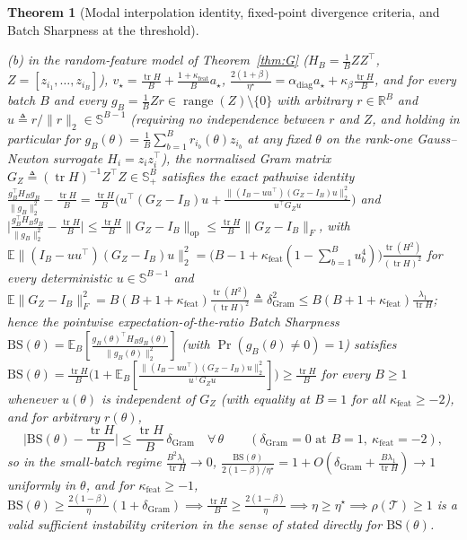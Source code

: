 \documentclass[11pt]{article}
\newtheorem{theorem}{Theorem}
\theoremstyle{remark}
\newcommand{\E}{\mathbb{E}}
\newcommand{\R}{\mathbb{R}}
\newcommand{\tr}{\operatorname{tr}}
\begin{document}
\begin{theorem}[Modal interpolation identity, fixed-point divergence criteria, and Batch Sharpness at the threshold]
\begin{enumerate}
(b) in the random-feature model of Theorem~\ref{thm:G} ($H_B=\frac1BZZ^\top$, $Z=[z_{i_1},\dots,z_{i_B}]$), $v_\star=\frac{\tr H}{B}+\frac{1+\kappa_{\mathrm{feat}}}{B}a_\star$, $\frac{2(1+\beta)}{\eta^\star}=\alpha_{\mathrm{diag}}a_\star+\kappa_\beta\frac{\tr H}{B}$, and for every batch $B$ and every $g_B=\frac1BZr\in\operatorname{range}(Z)\setminus\{0\}$ with arbitrary $r\in\R^B$ and $u\triangleq r/\|r\|_2\in\mathbb S^{B-1}$ (requiring no independence between $r$ and $Z$, and holding in particular for $g_B(\theta)=\frac1B\sum_{b=1}^Br_{i_b}(\theta)z_{i_b}$ at any fixed $\theta$ on the rank-one Gauss--Newton surrogate $H_i=z_iz_i^\top$), the normalised Gram matrix $G_Z\triangleq(\tr H)^{-1}Z^\top Z\in\mathbb S_+^B$ satisfies the exact pathwise identity $\frac{g_B^\top H_Bg_B}{\|g_B\|_2^2}-\frac{\tr H}{B}=\frac{\tr H}{B}\big(u^\top(G_Z-I_B)u+\frac{\|(I_B-uu^\top)(G_Z-I_B)u\|_2^2}{u^\top G_Zu}\big)$ and $\big|\frac{g_B^\top H_Bg_B}{\|g_B\|_2^2}-\frac{\tr H}{B}\big|\le\frac{\tr H}{B}\|G_Z-I_B\|_{\mathrm{op}}\le\frac{\tr H}{B}\|G_Z-I_B\|_F$, with $\E\|(I_B-uu^\top)(G_Z-I_B)u\|_2^2=\big(B-1+\kappa_{\mathrm{feat}}(1-\sum_{b=1}^Bu_b^4)\big)\frac{\tr(H^2)}{(\tr H)^2}$ for every deterministic $u\in\mathbb S^{B-1}$ and $\E\|G_Z-I_B\|_F^2=B(B+1+\kappa_{\mathrm{feat}})\frac{\tr(H^2)}{(\tr H)^2}\triangleq\delta_{\mathrm{Gram}}^2\le B(B+1+\kappa_{\mathrm{feat}})\frac{\lambda_1}{\tr H}$; hence the pointwise expectation-of-the-ratio Batch Sharpness $\mathrm{BS}(\theta)=\E_B[\frac{g_B(\theta)^\top H_Bg_B(\theta)}{\|g_B(\theta)\|_2^2}]$ (with $\Pr(g_B(\theta)\ne0)=1$) satisfies $\mathrm{BS}(\theta)=\frac{\tr H}{B}\big(1+\E_B[\frac{\|(I_B-uu^\top)(G_Z-I_B)u\|_2^2}{u^\top G_Zu}]\big)\ge\frac{\tr H}{B}$ for every $B\ge1$ whenever $u(\theta)$ is independent of $G_Z$ (with equality at $B=1$ for all $\kappa_{\mathrm{feat}}\ge-2$), and for arbitrary $r(\theta)$,
\begin{equation}\label{eq:bs-pointwise-gram}
\Big|\mathrm{BS}(\theta)-\frac{\tr H}{B}\Big|\le\frac{\tr H}{B}\,\delta_{\mathrm{Gram}}\quad\forall\,\theta\qquad(\delta_{\mathrm{Gram}}=0\text{ at }B=1,\ \kappa_{\mathrm{feat}}=-2),
\end{equation}
so in the small-batch regime $\frac{B^2\lambda_1}{\tr H}\to0$, $\frac{\mathrm{BS}(\theta)}{2(1-\beta)/\eta^\star}=1+O(\delta_{\mathrm{Gram}}+\frac{B\lambda_1}{\tr H})\to1$ uniformly in $\theta$, and for $\kappa_{\mathrm{feat}}\ge-1$, $\mathrm{BS}(\theta)\ge\frac{2(1-\beta)}{\eta}(1+\delta_{\mathrm{Gram}})\implies\frac{\tr H}{B}\ge\frac{2(1-\beta)}{\eta}\implies\eta\ge\eta^\star\implies\rho(\mathcal T)\ge1$ is a valid sufficient instability criterion in the sense of \citet[Definition~A.1]{andreyev2026momentum} stated directly for $\mathrm{BS}(\theta)$.

\end{enumerate}
\end{theorem}
\end{document}
